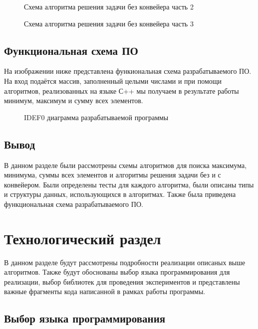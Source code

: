 \newpage

\begin{figure}[ph!]
	\caption{Схема алгоритма решения задачи без конвейера часть 2}
\end{figure}

\newpage

\begin{figure}[ph!]
	\caption{Схема алгоритма решения задачи без конвейера часть 3}
\end{figure}

\newpage

\section{Функциональная схема ПО}
На изображении ниже представлена функиональная схема разрабатываемого ПО. На вход подаётся массив, заполненный целыми числами и при помощи алгоритмов, реализованных на языке С++ мы получаем в результате работы минимум, максимум и сумму всех элементов.

\begin{figure}[ph!]
	\caption{IDEF0 диаграмма разрабатываемой программы}
\end{figure}

\section{Вывод}
В данном разделе были рассмотрены схемы алгоритмов для поиска максимума, минимума, суммы всех элементов и алгоритмы решения задачи без и с конвейером. Были определены тесты для каждого алгоритма, были описаны типы и структуры данных, использующихся в алгоритмах. Также была приведена функциональная схема разрабатываемого ПО.

\chapter{Технологический раздел}

В данном разделе будут рассмотрены подробности реализации описаных выше алгоритмов. Также будут обоснованы выбор языка программирования для реализации, выбор библиотек для проведения экспериментов и представлены важные фрагменты кода написанной в рамках работы программы.

\section{Выбор языка программирования}

